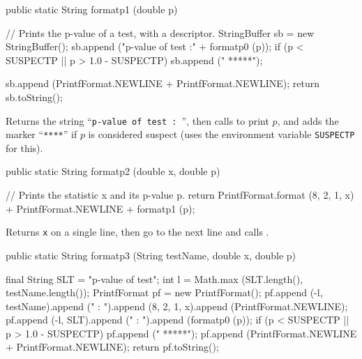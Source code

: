 \begin{htmlonly}
\end{htmlonly}
\begin{code}

   public static String formatp1 (double p)\begin{hide} {
      // Prints the p-value of a test, with a descriptor.
      StringBuffer sb = new StringBuffer();
      sb.append ("p-value of test                       :" + formatp0 (p));
      if (p < SUSPECTP || p > 1.0 - SUSPECTP)
         sb.append ("    *****");

      sb.append (PrintfFormat.NEWLINE + PrintfFormat.NEWLINE);
      return sb.toString();
   }\end{hide}
\end{code}
\begin{tabb}  Returns the string ``\texttt{p-value of test : }'',
  then calls  to print $p$, and adds
  the marker ``\texttt{****}'' if $p$ is considered suspect
  (uses the environment variable \texttt{SUSPECTP} for this).
\end{tabb}
\begin{htmlonly}
\end{htmlonly}
\begin{code}

   public static String formatp2 (double x, double p)\begin{hide} {
      // Prints the statistic x and its p-value p.
      return PrintfFormat.format (8, 2, 1, x) + PrintfFormat.NEWLINE +
             formatp1 (p);
   }\end{hide}
\end{code}
\begin{tabb}  Returns \texttt{x} on a single line, then go to the next line
   and calls .
\end{tabb}
\begin{htmlonly}
\end{htmlonly}
\begin{code}

   public static String formatp3 (String testName, double x, double p)\begin{hide} {
      final String SLT = "p-value of test";
      int l = Math.max (SLT.length(), testName.length());
      PrintfFormat pf = new PrintfFormat();
      pf.append (-l, testName).append (" : ").append (8, 2, 1, x).append
               (PrintfFormat.NEWLINE);
      pf.append (-l, SLT).append (" : ").append (formatp0 (p));
      if (p < SUSPECTP || p > 1.0 - SUSPECTP)
         pf.append ("    *****");
      pf.append (PrintfFormat.NEWLINE + PrintfFormat.NEWLINE);
      return pf.toString();
   }\end{hide}
\end{code}
